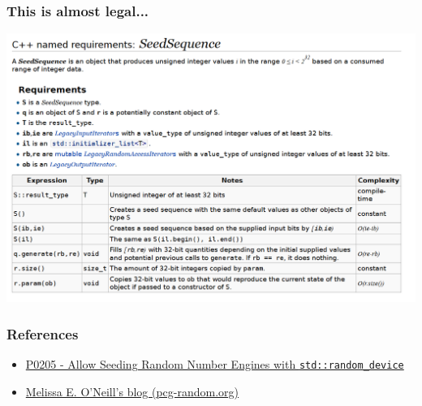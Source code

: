 \documentclass[aspectratio=169]{beamer}
\begin{document}
\begin{frame}
\frametitle{This is almost legal...}
\includegraphics[height=1.0\textheight]{resources/seedsequence_cppref.png}

\end{frame}


\begin{frame}
\frametitle{References}

\begin{itemize}
    \item \href{https://wg21.link/p0205r0}{P0205 - Allow Seeding Random Number Engines with \texttt{std::random\_device}}
    \item \href{http://www.pcg-random.org/categories/c\%2B\%2B.html}{Melissa E. O'Neill's blog (pcg-random.org)}
\end{itemize}

\end{frame}
\end{document}
